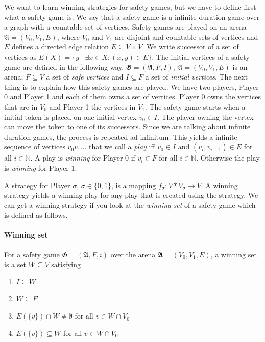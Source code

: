 \documentclass[10pt,a4paper]{article}
\theoremstyle{plain}
\theoremstyle{definition}
\begin{document}
We want to learn winning strategies for safety games, but we have to define first what a safety game is.
We say that a safety game is a infinite duration game over a graph with a countable set of vertices. Safety games are played on an arena $\mathfrak{A} = (V_{0}, V_{1}, E)$, where $V_{0}$ and $V_{1}$ are disjoint and countable sets of vertices and $E$ defines a directed edge relation $E \subseteq V \times V$. We write successor of a set of vertices as $E(X) = \{y \;|\; \exists x \in X : (x,y) \in E\}$.
The initial vertices of a safety game are defined in the following way. $\mathfrak{G} = (\mathfrak{A}, F, I)$, $\mathfrak{A} = (V_{0}, V_{1}, E)$ is an arena, $F \subseteq V$ a set of \textit{safe vertices} and $I \subseteq F$ a set of \textit{initial vertices}. The next thing is to explain how this safety games are played. We have two players, Player 0 and Player 1 and each of them owns a set of vertices. Player 0 owns the vertices that are in $V_{0}$ and Player 1 the vertices in $V_{1}$. The safety game starts when a initial token is placed on one initial vertex $v_{0} \in I$. The player owning the vertex can move the token to one of its successors. Since we are talking about infinite duration games, the process is repeated ad infinitum. This yields a infinite sequence of vertices $v_{0}v_{1}...$ that we call a \textit{play} iff $v_{0} \in I$ and $(v_{i}, v_{i+1}) \in E$ for all $i \in \mathbb{N}$. A play is \textit{winning} for Player 0 if $v_{i} \in F$ for all $i \in \mathbb{N}$. Otherwise the play is \textit{winning} for Player 1.

A strategy for Player $\sigma$, $\sigma \in \{0,1\}$, is a mapping $f_{\sigma} : V*V_{\sigma} \to V$. A winning strategy yields a winning play for any play that is created using the strategy. We can get a winning strategy if you look at the \textit{winning set} of a safety game which is defined as follows.
\paragraph*{Winning set} For a safety game $\mathfrak{G} = (\mathfrak{A}, F, i)$ over the arena $\mathfrak{A} = (V_{0}, V_{1}, E)$, a winning set is a set $W \subseteq V$ satisfying
\begin{enumerate}
\item $I \subseteq W$
\item $W \subseteq F$
\item $E(\{v\}) \cap W \neq \emptyset$ for all $v \in W \cap V_{0}$
\item $E(\{v\}) \subseteq W$ for all $v \in W \cap V_{0}$
\end{enumerate}
\end{document}

